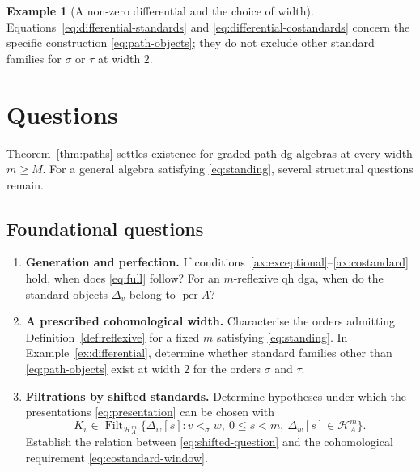 \documentclass[11pt,a4paper]{article}
\renewcommand{\H}{\mathcal H}
\newcommand{\std}{\Delta}
\DeclareMathOperator{\per}{per}
\DeclareMathOperator{\Filt}{Filt}
\theoremstyle{plain}
\theoremstyle{definition}
\newtheorem{example}[theorem]{Example}
\numberwithin{equation}{section}
\begin{document}
\begin{example}[A non-zero differential and the choice of width]
Equations~\eqref{eq:differential-standards} and
\eqref{eq:differential-costandards} concern the specific construction
\eqref{eq:path-objects}; they do not exclude other standard families
for $\sigma$ or $\tau$ at width $2$.
\end{example}

\section{Questions}\label{sec:questions}

Theorem~\ref{thm:paths} settles existence for graded path dg algebras
at every width $m\geq M$. For a general algebra satisfying
\eqref{eq:standing}, several structural questions remain.

\subsection*{Foundational questions}
\begin{enumerate}[label=\textbf{F\arabic*.}]
 \item \textbf{Generation and perfection.}
 If conditions~\ref{ax:exceptional}--\ref{ax:costandard} hold, when does
 \eqref{eq:full} follow? For an $m$-reflexive qh dga, when do the
 standard objects $\std_v$ belong to $\per A$?
 \item \textbf{A prescribed cohomological width.}
 Characterise the orders admitting Definition~\ref{def:reflexive}
 for a fixed $m$ satisfying \eqref{eq:standing}.
 In Example~\ref{ex:differential}, determine whether standard families
 other than \eqref{eq:path-objects} exist at width $2$ for the orders
 $\sigma$ and $\tau$.
 \item \textbf{Filtrations by shifted standards.}
 Determine hypotheses under which the presentations
 \eqref{eq:presentation} can be chosen with
 \begin{equation}\label{eq:shifted-question}
 K_v\in\Filt_{\H_A^m}
 \{\std_w[s]:v<_\sigma w,\ 0\leq s<m,\ \std_w[s]\in\H_A^m\}.
 \end{equation}
 Establish the relation between \eqref{eq:shifted-question} and the
 cohomological requirement \eqref{eq:costandard-window}.
\end{enumerate}
\end{document}
